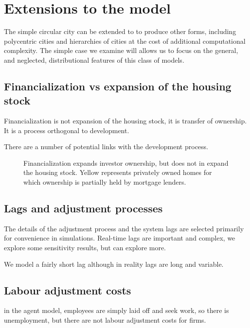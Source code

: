 \section{Extensions to the model}
The simple circular city can be extended to to produce other forms, including polycentric cities and hierarchies of cities at the cost of additional computational complexity. The simple case we examine will allows us to focus on the general, and neglected, distributional features of this class of models.

\subsection{Financialization vs expansion of the housing stock}

Financialization is not expansion of the housing stock, it is transfer of ownership. It is a process orthogonal to development.

There are a number of potential links with the development process.

\begin{figure}
\begin{center}

\end{center}
\caption{Financialization expands investor ownership, but does not in expand the housing stock. Yellow represents privately owned homes for which ownership is partially held by mortgage lenders.}
\label{fig-financialization-expansion}
\end{figure}


\subsection{Lags and adjustment processes}
The details of the adjustment process and the system lags are selected primarily for convenience in simulations. Real-time lags are important and complex, we explore some sensitivity results, but can explore more. 

We model a fairly short lag although in reality lags are long and variable. 

\subsection{Labour adjustment costs}

in the agent model, employees are simply laid off and seek work, so there is unemployment, but there are not \glspl{labour adjustment cost} for firms.

